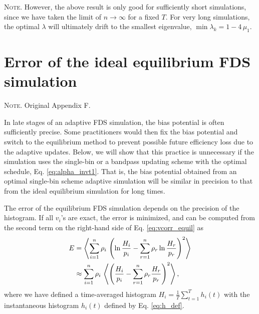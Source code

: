 \documentclass[preprint, floatfix]{revtex4-1}
\newcommand{\note}[1]{{\color{DarkGreen}\footnotesize \textsc{Note.} #1}}
\begin{document}
\note{
However, the above result %
is only good
for sufficiently short simulations,
since we have taken the limit of $n \to \infty$
for a fixed $T$.
%
For very long simulations,
the optimal $\lambda$
will ultimately drift to
the smallest eigenvalue,
$\min \lambda_k = 1 - 4 \, \mu_1$.
}







\section{\label{sec:equilerr}
Error of the ideal equilibrium FDS simulation}


\note{Original Appendix F.}


In late stages of an adaptive FDS simulation,
the bias potential is often sufficiently precise.
Some practitioners would then fix
the bias potential and switch
to the equilibrium method
to prevent possible future efficiency loss
due to the adaptive updates.
%
Below, we will show that this practice is unnecessary
if the simulation uses the single-bin or a bandpass updating scheme
with the optimal schedule, Eq. \eqref{eq:alpha_invt1}.
%
That is, the bias potential obtained from
an optimal single-bin scheme adaptive simulation
will be similar in precision to that from
the ideal equilibrium simulation
for long times.
%

The error of the equilibrium FDS simulation
depends on the precision of the histogram.
%
If all $v_i$'s are exact,
the error is minimized, and can be computed
from the second term
on the right-hand side of Eq. \eqref{eq:vcorr_equil} as
%
\begin{align}
  E
  &=
  \left\langle
    \sum_{ i = 1 }^ n
      \rho_i \,
      \left(
        \ln \frac { H_i }
                  { p_i }
        -
        \sum_{r = 1}^n \rho_r
        \ln \frac { H_r }
                  { p_r }
      \right)^2
  \right\rangle
  \notag
  \\
  &
  \approx
  \sum_{ i = 1 }^ n
    \rho_i \,
    \left\langle
      \left(
        \frac { H_i }
              { p_i }
        -
        \sum_{r = 1}^n \rho_r
            \frac { H_r }
                  { p_r }
      \right)^2
    \right\rangle,
\notag
\end{align}
where
we have defined a time-averaged histogram
$H_i = \frac{1}{T} \sum_{t = 1}^T h_i(t)$
with the instantaneous histogram
$h_i(t)$ defined by Eq. \eqref{eq:h_def}.
\end{document}
